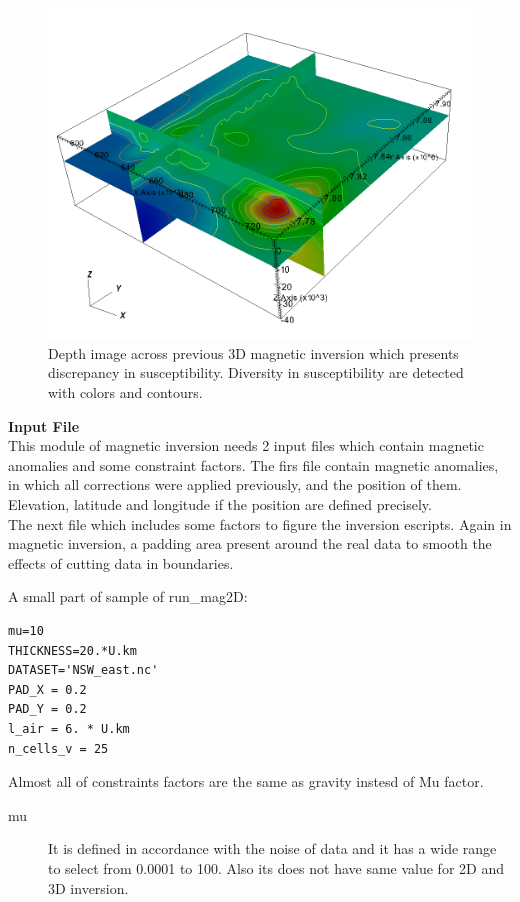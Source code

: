 \begin{figure}
\centering
\includegraphics[width=\textwidth]{sus3D.png}
\caption{Depth image across previous 3D magnetic inversion which presents discrepancy in susceptibility. Diversity in susceptibility are detected with colors and contours.}
\end{figure}

\textbf{Input File} \\

This module of magnetic inversion needs 2 input files which contain magnetic anomalies and some constraint factors. The firs file contain magnetic anomalies, in which all corrections were applied previously, and the position of them. Elevation, latitude and longitude if the position are defined precisely.\\
The next file which includes some factors to figure the inversion escripts. 
Again in magnetic inversion, a padding area present around the real data to smooth the effects of cutting data in boundaries.
 
A small part of sample of run_mag2D:\\
\begin{verbatim}
mu=10
THICKNESS=20.*U.km
DATASET='NSW_east.nc'
PAD_X = 0.2
PAD_Y = 0.2
l_air = 6. * U.km
n_cells_v = 25
\end{verbatim}

Almost all of constraints factors are the same as gravity instesd of Mu factor.\\

\begin{description} 	

\item[mu]
It is defined in accordance with the noise of data and it has a wide range to select from 0.0001 to 100. Also its does not have same value for 2D and 3D inversion.

\end{description}

